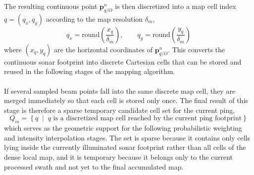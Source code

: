 The resulting continuous point $\mathbf{p}_{q/O}^{n}$ is then discretized into a map cell index $q=(q_x,q_y)$ according to the map resolution $\delta_m$,
$$
    q_x = \mathrm{round}\!\left(\frac{x_q}{\delta_m}\right),
    \qquad
    q_y = \mathrm{round}\!\left(\frac{y_q}{\delta_m}\right)
$$
where $(x_q,y_q)$ are the horizontal coordinates of $\mathbf{p}_{q/O}^{n}$. This converts the continuous sonar footprint into discrete Cartesian cells that can be stored and reused in the following stages of the mapping algorithm.
\\ \\
If several sampled beam points fall into the same discrete map cell, they are merged immediately so that each cell is stored only once. The final result of this stage is therefore a sparse temporary candidate cell set for the current ping,
\begin{equation}
    Q_m = \left\{ q \;\middle|\; q \text{ is a discretized map cell reached by the current ping footprint} \right\}
    \label{eq:local-map-generation-qm-candidate}
\end{equation}
which serves as the geometric support for the following probabilistic weighting and intensity interpolation stages. The set is sparse because it contains only cells lying inside the currently illuminated sonar footprint rather than all cells of the dense local map, and it is temporary because it belongs only to the current processed swath and not yet to the final accumulated map.



